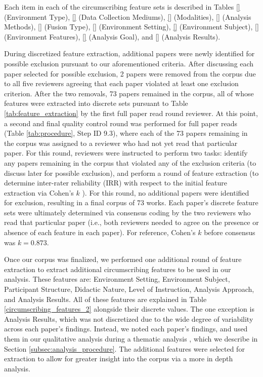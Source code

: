 \documentclass[manuscript,screen,review]{acmart}
\begin{document}
Each item in each of the circumscribing feature sets is described in Tables \ref{} (Environment Type), \ref{} (Data Collection Mediums), \ref{} (Modalities), \ref{} (Analysis Methods), \ref{} (Fusion Type), \ref{} (Environment Setting), \ref{} (Environment Subject), \ref{} (Environment Features), \ref{} (Analysis Goal), and \ref{} (Analysis Results).

During discretized feature extraction, additional papers were newly identified for possible exclusion pursuant to our aforementioned criteria. After discussing each paper selected for possible exclusion, 2 papers were removed from the corpus due to all five reviewers agreeing that each paper violated at least one exclusion criterion. After the two removals, 73 papers remained in the corpus, all of whose features were extracted into discrete sets pursuant to Table \ref{tab:feature_extraction} by the first full paper read round reviewer. At this point, a second and final quality control round was performed for full paper reads (Table \ref{tab:procedure}, Step ID 9.3), where each of the 73 papers remaining in the corpus was assigned to a reviewer who had not yet read that particular paper. For this round, reviewers were instructed to perform two tasks: identify any papers remaining in the corpus that violated any of the exclusion criteria (to discuss later for possible exclusion), and perform a round of feature extraction (to determine inter-rater reliability (IRR) with respect to the initial feature extraction via Cohen's $k$ \cite{cohen1960coefficient}). For this round, no additional papers were identified for exclusion, resulting in a final corpus of 73 works. Each paper's discrete feature sets were ultimately determined via consensus coding \cite{} by the two reviewers who read that particular paper (i.e., both reviewers needed to agree on the presence or absence of each feature in each paper). For reference, Cohen's $k$ before consensus was $k=0.873$.  

Once our corpus was finalized, we performed one additional round of feature extraction to extract additional circumscribing features to be used in our analysis. These features are: Environment Setting, Environment Subject, Participant Structure, Didactic Nature, Level of Instruction, Analysis Approach, and Analysis Results. All of these features are explained in Table \ref{circumscribing_features_2} alongside their discrete values. The one exception is Analysis Results, which was not discretized due to the wide degree of variability across each paper's findings. Instead, we noted each paper's findings, and used them in our qualitative analysis during a thematic analysis \cite{braun2012thematic}, which we describe in Section \ref{subsec:analysis_procedure}. The additional features were selected for extraction to allow for greater insight into the corpus via a more in depth analysis.
\end{document}

